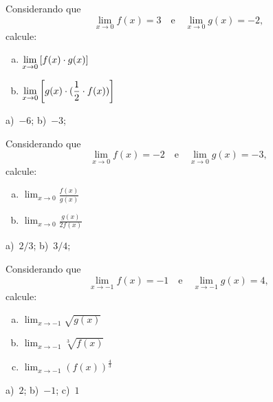 \cleardoublepage\documentclass[../main.tex]{subfiles}
\begin{document}
\begin{exer}
  Considerando que
  \begin{equation*}
    \lim_{x\to 0} f(x) = 3\quad\text{e}\quad\lim_{x\to 0} g(x) = -2,
  \end{equation*}
  calcule:
  \begin{enumerate}[a)]
  \item $\displaystyle\lim_{x\to 0} \left[f(x)\cdot g(x)\right]$
  \item $\displaystyle\lim_{x\to 0} \left[g(x)\cdot (\frac{1}{2}\cdot f(x))\right]$
  \end{enumerate}
\end{exer}
\begin{resp}
  a)~$-6$; b)~$-3$;
\end{resp}

\begin{exer}
  Considerando que
  \begin{equation*}
    \lim_{x\to 0} f(x) = -2\quad\text{e}\quad\lim_{x\to 0} g(x) = -3,
  \end{equation*}
  calcule:
  \begin{multicols}{2}
    \begin{enumerate}[a)]
  \item $\displaystyle\lim_{x\to 0} \frac{f(x)}{g(x)}$
  \item $\displaystyle\lim_{x\to 0} \frac{g(x)}{2f(x)}$
  \end{enumerate}
  \end{multicols}
\end{exer}
\begin{resp}
  a)~$2/3$; b)~$3/4$;
\end{resp}

\begin{exer}
  Considerando que
  \begin{equation*}
    \lim_{x\to -1} f(x) = -1\quad\text{e}\quad\lim_{x\to -1} g(x) = 4,
  \end{equation*}
  calcule:
  \begin{multicols}{3}
    \begin{enumerate}[a)]
  \item $\displaystyle\lim_{x\to -1} \sqrt{g(x)}$
  \item $\displaystyle\lim_{x\to -1} \sqrt[3]{f(x)}$
  \item $\displaystyle\lim_{x\to -1} (f(x))^{\frac{4}{3}}$
  \end{enumerate}
  \end{multicols}

\end{exer}
\begin{resp}
  a)~$2$; b)~$-1$; c)~$1$
\end{resp}
\end{document}
